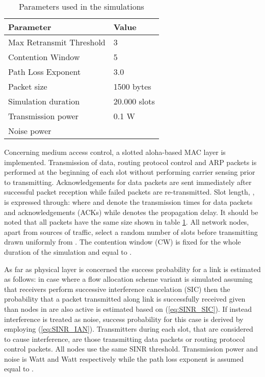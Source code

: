 \documentclass[conference]{IEEEtran}
\begin{document}
\begin{table}[t]
\caption{Parameters used in the simulations}
\label{tab:param_simul}
\begin{center}
\begin{tabular}{ll}
\hline
Parameter & Value\\ \hline
Max Retransmit Threshold & 3\\
Contention Window & 5\\
Path Loss Exponent & 3.0\\
Packet size & 1500 bytes\\
Simulation duration & 20.000 slots\\
Transmission power & 0.1 W\\
Noise power & \\
\hline
\end{tabular}
\end{center}
\end{table}

Concerning medium access control, a slotted aloha-based MAC layer is implemented.
Transmission of data, routing protocol control and ARP packets is performed at the beginning of each slot without performing carrier sensing prior to transmitting.
Acknowledgements for data packets are sent immediately after successful packet reception while failed packets are re-transmitted.
Slot length, , is expressed through:  where  and  denote
the transmission times for data packets and acknowledgements (ACKs) while  denotes the propagation delay.
It should be noted that all packets have the same size shown in table \ref{tab:param_simul}.
All network nodes, apart from sources of traffic, select a random number of slots before transmitting drawn
uniformly from . The contention window (CW) is fixed for the whole duration of the simulation and equal to .

As far as physical layer is concerned the success probability for a link
is estimated as follows: in case where a flow allocation scheme variant is simulated assuming
that receivers perform successive interference cancelation (SIC) then the probability that a packet transmitted along link 
is successfully received given than nodes in  are also active is estimated based on (\ref{eq:SINR_SIC}).
If instead interference is treated as noise, success probability for this case is derived by employing (\ref{eq:SINR_IAN}).
Transmitters during each slot, that are considered to cause interference, are those transmitting data packets or routing protocol control packets.
All nodes use the same SINR threshold. Transmission power and noise is  Watt and  Watt respectively
while the path loss exponent is assumed equal to .
\end{document}

